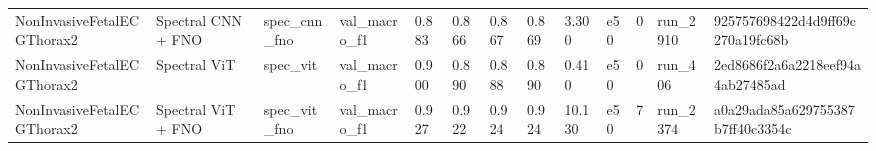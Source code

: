 \begin{table}
\begin{tabular}{lllllllllllll}
NonInvasiveFetalECGThorax2 & Spectral CNN + FNO & spec\_cnn\_fno & val\_macro\_f1 & 0.883 & 0.866 & 0.867 & 0.869 & 3.300 & e50 & 0 & run\_2910 & 925757698422d4d9ff69c270a19fc68b \\
NonInvasiveFetalECGThorax2 & Spectral ViT & spec\_vit & val\_macro\_f1 & 0.900 & 0.890 & 0.888 & 0.890 & 0.410 & e50 & 0 & run\_406 & 2ed8686f2a6a2218eef94a4ab27485ad \\
NonInvasiveFetalECGThorax2 & Spectral ViT + FNO & spec\_vit\_fno & val\_macro\_f1 & 0.927 & 0.922 & 0.924 & 0.924 & 10.130 & e50 & 7 & run\_2374 & a0a29ada85a629755387b7ff40c3354c \\
\bottomrule
\end{tabular}
\end{table}
